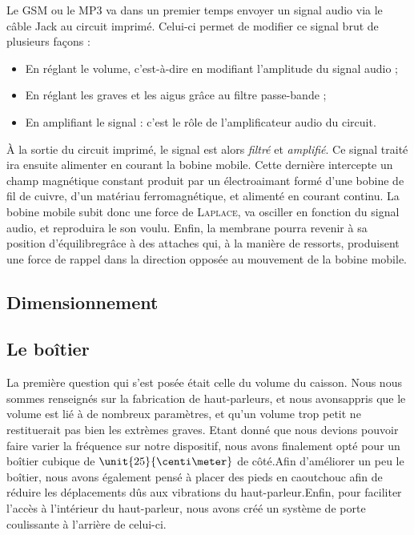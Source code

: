 Le GSM ou le MP3 va dans un premier temps envoyer un signal audio via le câble Jack au circuit imprimé. Celui-ci permet
 de modifier ce signal brut de plusieurs façons :

\begin{itemize}
\item En réglant le volume, c'est-à-dire en modifiant l'amplitude du signal audio ;
\item En réglant les graves et les aigus grâce au filtre passe-bande ;
\item En amplifiant le signal : c'est le rôle de l'amplificateur audio du circuit.
\end{itemize}

À la sortie du circuit imprimé, le signal est alors \textit{filtré} et \textit{amplifié}.
Ce signal traité ira ensuite alimenter en courant la bobine mobile. Cette dernière intercepte un champ magnétique constant 
produit par un électroaimant formé d'une bobine de fil de cuivre, d'un matériau ferromagnétique, et alimenté en courant continu.
La bobine mobile subit donc une force de \textsc{Laplace}, va osciller en fonction du  signal audio, et reproduira le son voulu.
Enfin, la membrane pourra revenir à sa position d'équilibregrâce à des attaches qui, à la manière de ressorts, produisent une
force de rappel dans la direction opposée au mouvement de la bobine mobile. 

\subsection{Dimensionnement}


\subsection{Le boîtier}
La première question qui s'est posée était celle du volume du caisson. Nous nous sommes renseignés sur la fabrication de 
haut-parleurs, et nous avonsappris que le volume est lié à de nombreux paramètres, et qu'un volume trop petit ne restituerait 
pas bien les extrèmes graves. Etant donné que nous devions pouvoir faire varier la fréquence sur notre dispositif, nous avons 
finalement opté pour un boîtier cubique de $\unit{25}{\centi\meter}$ de côté.Afin d'améliorer un peu le boîtier, nous avons
également pensé à placer des pieds en caoutchouc afin de réduire les déplacements dûs aux vibrations du haut-parleur.Enfin,
pour faciliter l'accès à l'intérieur du haut-parleur, nous avons créé un système de porte coulissante à l'arrière de celui-ci.

